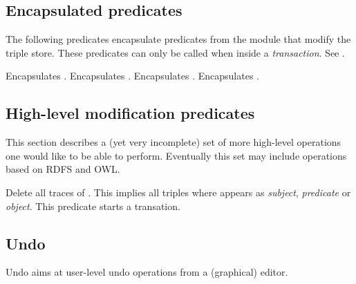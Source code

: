 \documentclass[11pt]{article}
\begin{document}
\subsection{Encapsulated predicates}		\label{sec:rdfeencap}

The following predicates encapsulate predicates from the 
module that modify the triple store. These predicates can only be called
when inside a \emph{transaction}.  See .

\begin{description}
Encapsulates .
Encapsulates .
Encapsulates .
Encapsulates .
\end{description}

\subsection{High-level modification predicates}	\label{sec:rdfeedit}

This section describes a (yet very incomplete) set of more high-level
operations one would like to be able to perform.  Eventually this set
may include operations based on RDFS and OWL.

\begin{description}
Delete all traces of .  This implies all triples where
 appears as \emph{subject}, \emph{predicate} or
\emph{object}.  This predicate starts a transation.
\end{description}

\subsection{Undo}

%
Undo aims at user-level undo operations from a (graphical) editor.
\end{document}
